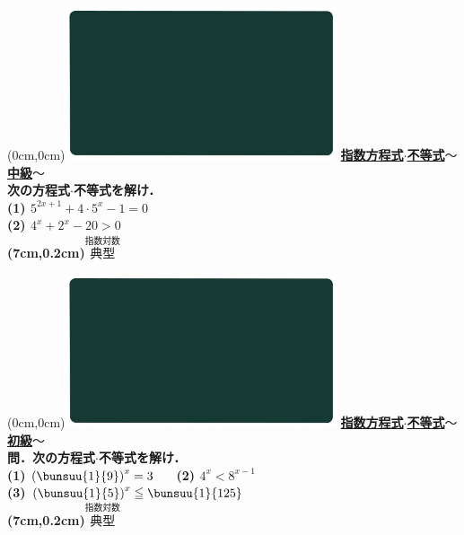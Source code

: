 \documentclass[10pt,
fleqn,
dvipdfmx,
uplatex
]{jsarticle}
\begin{document}
\newpage


\at(0cm,0cm){\includegraphics[width=8cm,bb=0 0 1920 1080]{./media_local/smart_background/指数対数.jpeg}}
{\color{orange}\bf\boldmath\Large\underline{指数方程式$\cdot$不等式$〜$中級$〜$}}\vspace{0.3zw}\\
\LARGE 
\bf\boldmath 次の方程式$\cdot$不等式を解け．\vspace{0.3zw}\\
(1)  $5^{2x+1}+4\cdot 5^x-1=0$\\
(2)  $4^x+2^x-{20}>0$\\

\at(7cm,0.2cm){\small\color{bradorange}$\overset{\text{指数対数}}{\text{典型}}$}


\newpage



\at(0cm,0cm){\includegraphics[width=8cm,bb=0 0 1920 1080]{./media_local/smart_background/指数対数.jpeg}}
{\color{orange}\bf\boldmath\Large\underline{指数方程式$\cdot$不等式$〜$初級$〜$}}\vspace{0.3zw}\\
\Large 
\bf\boldmath 問．次の方程式$\cdot$不等式を解け．\vspace{0.3zw}\\
(1)  $\left(\bunsuu{1}{9}\right)^x=3$\ \ \ 
(2)  $4^x<8^{x-1}$\\
(3)  $\left(\bunsuu{1}{5}\right)^x\leqq \bunsuu{1}{{{125}}}$\\

\at(7cm,0.2cm){\small\color{bradorange}$\overset{\text{指数対数}}{\text{典型}}$}
\end{document}
